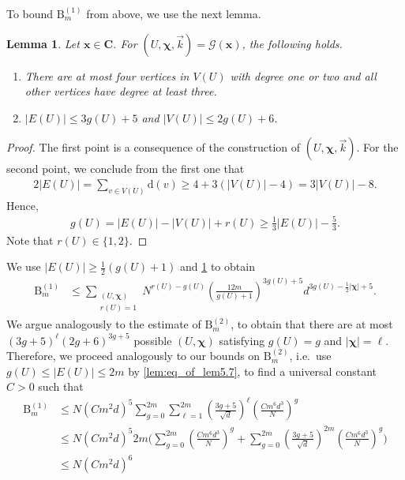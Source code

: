 \documentclass[10pt,a4paper]{amsart}
\newcommand{\abs}[1]{\left| #1 \right|}
\newcommand{\patx}{\boldsymbol{x}}
\newcommand{\patchi}{\boldsymbol{\chi}}
\newtheorem{lemma}{Lemma}[section]
\numberwithin{equation}{section}
\newcommand{\nc}{\normalcolor}
\begin{document}
To bound $\mathrm{B}^{(1)}_{m}$ from above, we use the next lemma. 
\begin{lemma}\label{lem:bound_case_ru<r}
    Let $\patx \in \boldsymbol C$. For $(U, \patchi, \vec{k})=\mathcal G(\patx)$, the following holds. 
    \begin{enumerate}
      \item  
      There are at most four vertices in $V(U)$  with degree one or two and all other vertices have degree at least three. 
      \nc 
        \item $|E(U)| \le 3g(U) + 5$ and $|V(U)| \le 2g(U) + 6$.
    \end{enumerate}
\end{lemma}

\begin{proof}
    The first point is a consequence of the construction of $(U, \patchi, \vec{k})$. 
    For the second point, we conclude from the first one that 
    \begin{align*}
        2|E(U)| = \sum_{v \in V(U)} \mathrm{d}(v) 
        \ge 4 + 3(|V(U)| - 4) = 3 |V(U)| - 8. 
    \end{align*}
    Hence, 
    \begin{align*}
        g(U) = |E(U)|- |V(U)| + r(U) \ge \frac{1}{3} |E(U)| - \frac{5}{3}.
    \end{align*}
    Note that $r(U) \in \{1 ,2 \}$. 
\end{proof}
We use $|E(U)| \ge \frac{1}{2}(g(U)+1)$  and \cref{lem:bound_case_ru<r} to obtain 
\begin{align*}
    \mathrm{B}_{m}^{(1)} &\le \sum_{\substack{(U,\patchi)\\ r(U)=1}} N^{r(U)-g(U)} \left(\frac{12m}{g(U)+1}\right)^{3g(U)+5}d^{3g(U) - \frac{1}{2}|\patchi| + 5}.
\end{align*}
 We argue analogously to the estimate of $\mathrm{B}_{m}^{(2)}$, to obtain that there are at most $(3g+ 5)^\ell (2g + 6)^{3g+5}$ possible $(U,\patchi)$ satisfying $g(U)=g$ and $|\patchi|=\ell$. Therefore, we proceed analogously to our bounds on $\mathrm{B}_m^{(2)}$, i.e.\ use  $g(U) \leq \abs{E(U)} \leq 2m$ by \cref{lem:eq_of_lem5.7},
to find a universal constant $C>0$ such that 
\begin{align*}
        \mathrm{B}_{m}^{(1)} &\le N (Cm^2d)^{5}\sum_{g=0}^{2m} \sum_{\ell=1}^{2m}\left(\frac{3g+5}{\sqrt{d}}\right)^\ell \left(\frac{C m^6d^3}{N}\right)^g\\
        &\le  N(Cm^2d)^{5} 2m \biggl(  \sum_{g=0}^{2m}  \left(\frac{Cm^6d^3}{N}\right)^g + \sum_{g=0}^{2m}\left(\frac{3g + 5}{\sqrt{d}}\right)^{2m} \left(\frac{C m^6d^3}{N}\right)^g \biggr)\\
        &\le N (Cm^2d)^{6} 
\end{align*}
\end{document}
